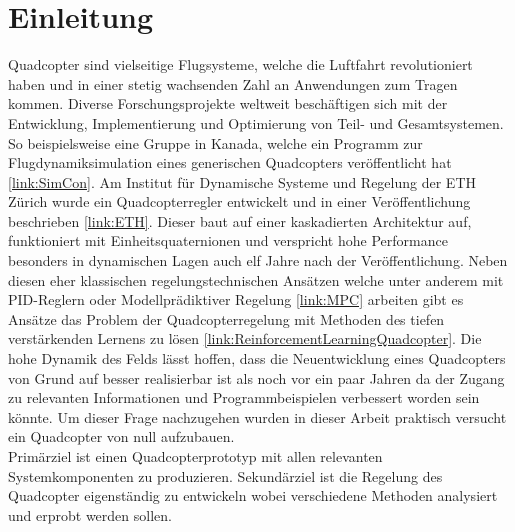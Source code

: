 \section{Einleitung} 
Quadcopter sind vielseitige Flugsysteme, welche die Luftfahrt revolutioniert haben und in einer stetig wachsenden Zahl an Anwendungen zum Tragen kommen. Diverse Forschungsprojekte weltweit beschäftigen sich mit der Entwicklung, Implementierung und Optimierung von Teil- und Gesamtsystemen. So beispielsweise eine Gruppe in Kanada, welche ein Programm zur Flugdynamiksimulation eines generischen Quadcopters veröffentlicht hat \ref{link:SimCon}. Am Institut für Dynamische Systeme und Regelung der ETH Zürich wurde ein Quadcopterregler entwickelt und in einer Veröffentlichung beschrieben \ref{link:ETH}. Dieser baut auf einer kaskadierten Architektur auf, funktioniert mit Einheitsquaternionen und verspricht hohe Performance besonders in dynamischen Lagen auch elf Jahre nach der Veröffentlichung. Neben diesen eher klassischen regelungstechnischen Ansätzen welche unter anderem mit PID-Reglern oder Modellprädiktiver Regelung \ref{link:MPC} arbeiten gibt es Ansätze das Problem der Quadcopterregelung mit Methoden des tiefen verstärkenden Lernens zu lösen \ref{link:ReinforcementLearningQuadcopter}. Die hohe Dynamik des Felds lässt hoffen, dass die Neuentwicklung eines Quadcopters von Grund auf besser realisierbar ist als noch vor ein paar Jahren da der Zugang zu relevanten Informationen und Programmbeispielen verbessert worden sein könnte. Um dieser Frage nachzugehen wurden in dieser Arbeit praktisch versucht ein Quadcopter von null aufzubauen.\\
Primärziel ist einen Quadcopterprototyp mit allen relevanten Systemkomponenten zu produzieren. Sekundärziel ist die Regelung des Quadcopter eigenständig zu entwickeln wobei verschiedene Methoden analysiert und erprobt werden sollen.
